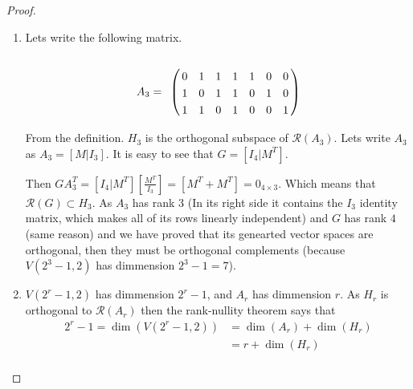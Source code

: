 \begin{proof}
    \begin{enumerate}[label=(\roman*)]
        \item   
            Lets write the following matrix.
            \begin{align}
                A_3 =
                    \bordermatrix{
                            &       &       &       &       &       &       &       \cr
                            &   0   &   1   &   1   &   1   &   1   &   0   & 0     \cr
                            &   1   &   0   &   1   &   1   &   0   &   1   & 0     \cr
                            &   1   &   1   &   0   &   1   &   0   &   0   & 1     \cr
                    }        
            \end{align}
            
            From the definition. $H_3$ is the orthogonal subspace of $\mathcal{R}(A_3)$. Lets write $A_3$ as $A_3 = [ M | I_3]$. It is easy to
            see that $G = [I_4 | M^T]$.\pn
            
            Then $G A_3^T =  [I_4 | M^T] [\frac{M^T}{I_3}] = [M^T + M^T] = 0_{4 \times 3}$. Which means that $\mathcal{R}(G) \subset H_3$.
            As $A_3$ has rank $3$ (In its right side it contains the $I_3$ identity matrix, which makes all of its rows linearly independent) and $G$ has
            rank $4$ (same reason) and we have proved that its genearted vector spaces are orthogonal, then they must be orthogonal complements (because
            $V(2^3 -1, 2)$ has dimmension $2^3 - 1 = 7$).
        \item
            $V(2^r -1, 2)$ has dimmension $2^r - 1$, and $A_r$ has dimmension $r$. As $H_r$ is orthogonal to $\mathcal{R}(A_r)$ then the rank-nullity theorem
            says that 
            \begin{align}
                    2^r - 1 = \dim(V(2^r -1, 2))    &=  \dim(A_r) + \dim(H_r)   \\
                                                    &=  r + \dim(H_r)           \\
            \end{align}
            

\end{enumerate}
\end{proof}
